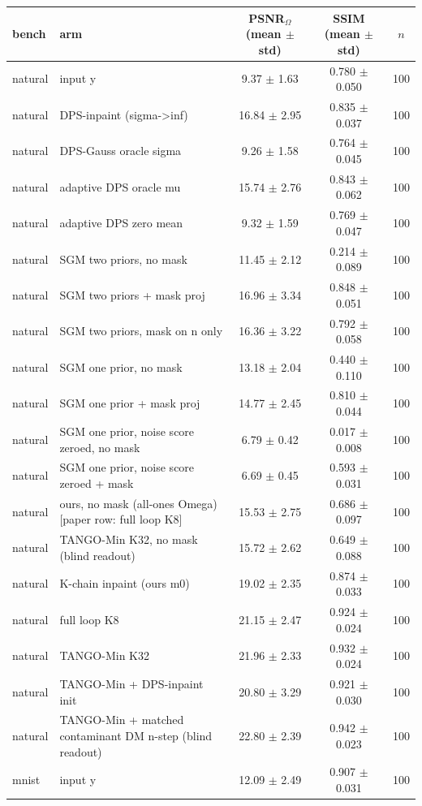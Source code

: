 \begin{tabular}{llccc}
\toprule
bench & arm & PSNR$_\Omega$ (mean $\pm$ std) & SSIM (mean $\pm$ std) & $n$\\
\midrule
natural & input y & 9.37 $\pm$ 1.63 & 0.780 $\pm$ 0.050 & 100\\
natural & DPS-inpaint (sigma->inf) & 16.84 $\pm$ 2.95 & 0.835 $\pm$ 0.037 & 100\\
natural & DPS-Gauss oracle sigma & 9.26 $\pm$ 1.58 & 0.764 $\pm$ 0.045 & 100\\
natural & adaptive DPS oracle mu & 15.74 $\pm$ 2.76 & 0.843 $\pm$ 0.062 & 100\\
natural & adaptive DPS zero mean & 9.32 $\pm$ 1.59 & 0.769 $\pm$ 0.047 & 100\\
natural & SGM two priors, no mask & 11.45 $\pm$ 2.12 & 0.214 $\pm$ 0.089 & 100\\
natural & SGM two priors + mask proj & 16.96 $\pm$ 3.34 & 0.848 $\pm$ 0.051 & 100\\
natural & SGM two priors, mask on n only & 16.36 $\pm$ 3.22 & 0.792 $\pm$ 0.058 & 100\\
natural & SGM one prior, no mask & 13.18 $\pm$ 2.04 & 0.440 $\pm$ 0.110 & 100\\
natural & SGM one prior + mask proj & 14.77 $\pm$ 2.45 & 0.810 $\pm$ 0.044 & 100\\
natural & SGM one prior, noise score zeroed, no mask & 6.79 $\pm$ 0.42 & 0.017 $\pm$ 0.008 & 100\\
natural & SGM one prior, noise score zeroed + mask & 6.69 $\pm$ 0.45 & 0.593 $\pm$ 0.031 & 100\\
natural & ours, no mask (all-ones Omega) [paper row: full loop K8] & 15.53 $\pm$ 2.75 & 0.686 $\pm$ 0.097 & 100\\
natural & TANGO-Min K32, no mask (blind readout) & 15.72 $\pm$ 2.62 & 0.649 $\pm$ 0.088 & 100\\
natural & K-chain inpaint (ours m0) & 19.02 $\pm$ 2.35 & 0.874 $\pm$ 0.033 & 100\\
natural & full loop K8 & 21.15 $\pm$ 2.47 & 0.924 $\pm$ 0.024 & 100\\
natural & TANGO-Min K32 & 21.96 $\pm$ 2.33 & 0.932 $\pm$ 0.024 & 100\\
natural & TANGO-Min + DPS-inpaint init & 20.80 $\pm$ 3.29 & 0.921 $\pm$ 0.030 & 100\\
natural & TANGO-Min + matched contaminant DM n-step (blind readout) & 22.80 $\pm$ 2.39 & 0.942 $\pm$ 0.023 & 100\\
\midrule
mnist & input y & 12.09 $\pm$ 2.49 & 0.907 $\pm$ 0.031 & 100\\

\end{tabular}
